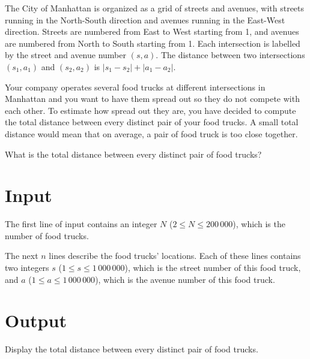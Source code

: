 
The City of Manhattan is organized as a grid of streets and avenues,
with streets running in the North-South direction and avenues running
in the East-West direction.  Streets are numbered from East to West
starting from 1, and avenues are numbered from North to South starting
from 1.  Each intersection is labelled by the street and avenue number
$(s, a)$.  The distance between two intersections $(s_1, a_1)$ and
$(s_2, a_2)$ is $|s_1-s_2| + |a_1-a_2|$.

Your company operates several food trucks at different intersections in
Manhattan and you want to have them spread out so they do not compete
with each other.  To estimate how spread out they are, you have
decided to compute the total distance between every distinct pair of
your food trucks.  A small total distance would mean that on average,
a pair of food truck is too close together.

What is the total distance between every distinct pair of food trucks?

\section*{Input}

The first line of input contains an integer $N$
($2 \leq N \leq 200\,000$), which is the number of food trucks.

The next $n$ lines describe the food trucks' locations. Each of
these lines contains two integers $s$ ($1 \leq s \leq 1\,000\,000$),
which is the street number of this food truck, and $a$
($1 \leq a \leq 1\,000\,000$), which is the avenue number of this
food truck.

\section*{Output}

Display the total distance between every distinct pair of food trucks.
